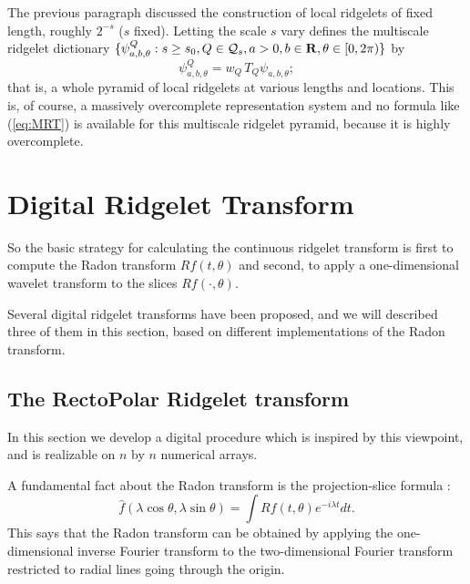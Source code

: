 The previous paragraph discussed the construction of local ridgelets
of fixed length, roughly $2^{-s}$ ($s$ fixed). Letting the scale $s$
vary defines the multiscale ridgelet dictionary
$\{\psi^Q_{a,b,\theta}: s \ge s_0, Q \in {\cal Q}_s, a > 0, b \in {\bf R},
\theta \in [0,2\pi)\}$ by
\[
\psi^Q_{a,b,\theta} = w_Q \, T_Q \psi_{a,b,\theta};
\]
that is, a whole pyramid of local ridgelets at various lengths and
locations. This is, of course, a massively overcomplete representation
system and no formula like (\ref{eq:MRT}) is available for this
multiscale ridgelet pyramid, because it is highly overcomplete.
 
\section{Digital Ridgelet Transform}
So the basic strategy for calculating the
continuous ridgelet transform is first to compute the Radon transform
$Rf(t,\theta)$ and second, to apply a one-dimensional wavelet
transform to the slices $Rf(\cdot,\theta)$.  

Several digital ridgelet transforms have been proposed, and we will described
three of them in this section, based on different implementations of the
Radon transform.

\subsection{The RectoPolar Ridgelet transform}
In this section 
we develop a digital procedure which is inspired by this viewpoint,
and is realizable on $n$ by $n$ numerical arrays.

 A fundamental fact about the Radon transform is the
projection-slice formula \cite{Deans}:
\[
\hat{f}(\lambda \cos\theta, \lambda \sin\theta) = \int Rf(t,\theta)
e^{-i\lambda t} dt.
\]
This says that the Radon transform can be obtained by applying the
one-dimensional inverse Fourier transform to the two-dimensional
Fourier transform restricted to radial lines going through the origin.

